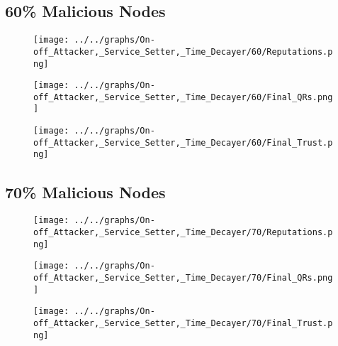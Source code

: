 \begin{minipage}[t]{0.49\columnwidth}
\subsection*{60\% Malicious Nodes}
    \begin{figure}[H]
        \centering
        \texttt{[image: ../../graphs/On-off\_Attacker,\_Service\_Setter,\_Time\_Decayer/60/Reputations.png]}
    \end{figure}
    \begin{figure}[H]
        \centering
        \texttt{[image: ../../graphs/On-off\_Attacker,\_Service\_Setter,\_Time\_Decayer/60/Final\_QRs.png]}
    \end{figure}
\end{minipage}
\begin{minipage}[t]{0.49\columnwidth}
    \begin{figure}[H]
        \centering
        \texttt{[image: ../../graphs/On-off\_Attacker,\_Service\_Setter,\_Time\_Decayer/60/Final\_Trust.png]}
    \end{figure}
\end{minipage}

\begin{minipage}[t]{0.49\columnwidth}
\subsection*{70\% Malicious Nodes}
    \begin{figure}[H]
        \centering
        \texttt{[image: ../../graphs/On-off\_Attacker,\_Service\_Setter,\_Time\_Decayer/70/Reputations.png]}
    \end{figure}
    \begin{figure}[H]
        \centering
        \texttt{[image: ../../graphs/On-off\_Attacker,\_Service\_Setter,\_Time\_Decayer/70/Final\_QRs.png]}
    \end{figure}
\end{minipage}
\begin{minipage}[t]{0.49\columnwidth}
    \begin{figure}[H]
        \centering
        \texttt{[image: ../../graphs/On-off\_Attacker,\_Service\_Setter,\_Time\_Decayer/70/Final\_Trust.png]}
    \end{figure}
\end{minipage}

